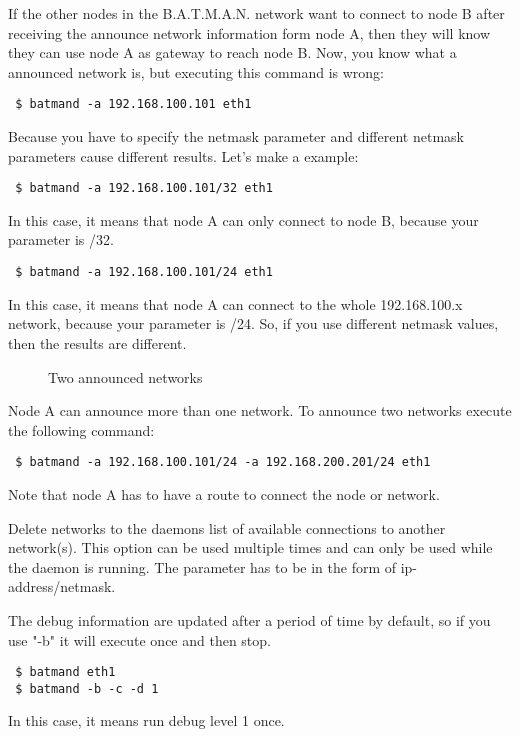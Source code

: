 If the other nodes in the B.A.T.M.A.N. network want to connect to node B after
receiving the announce network information form node A, then they will know they
can use node A as gateway to reach node B. Now, you know what a announced
network is, but executing this command is wrong:
\begin{verbatim}
 $ batmand -a 192.168.100.101 eth1
\end{verbatim}

Because you have to specify the netmask parameter and different netmask
parameters cause different results. Let's make a example:
\begin{verbatim}
 $ batmand -a 192.168.100.101/32 eth1
\end{verbatim}
In this case, it means that node A can only connect to node B, because your
parameter is /32.

\begin{verbatim}
 $ batmand -a 192.168.100.101/24 eth1
\end{verbatim}
In this case, it means that node A can connect to the whole 192.168.100.x
network, because your parameter is /24. So, if you use different netmask values,
then the results are different.

\begin{figure}[H]
 \begin{center}
  
 \end{center}
  \caption{Two announced networks}
\end{figure}

Node A can announce more than one network. To announce two networks execute the
following command:
\begin{verbatim}
 $ batmand -a 192.168.100.101/24 -a 192.168.200.201/24 eth1
\end{verbatim}
Note that node A has to have a route to connect the node or network.

Delete networks to the daemons list of available connections to another
network(s). This option can be used multiple times and can only be used while
the daemon is running. The parameter has to be in the form of
ip-address/netmask.

The debug information are updated after a period of time by default, so if you
use "-b" it will execute once and then stop.
\begin{verbatim}
 $ batmand eth1
 $ batmand -b -c -d 1
\end{verbatim}
In this case, it means run debug level 1 once.

